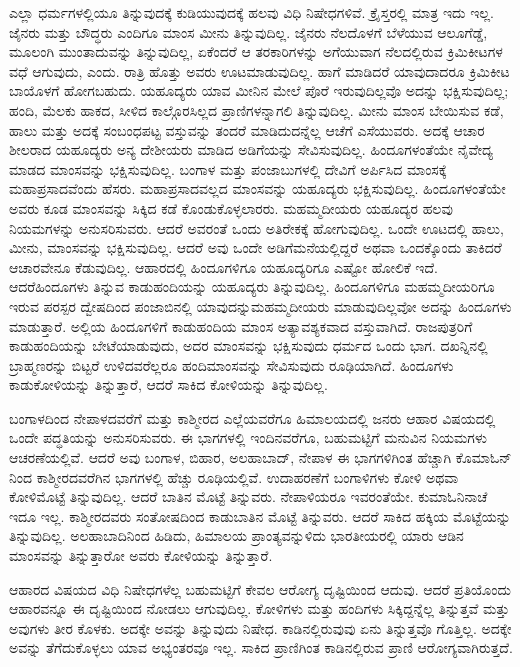 ಎಲ್ಲಾ ಧರ್ಮಗಳಲ್ಲಿಯೂ ತಿನ್ನುವುದಕ್ಕೆ ಕುಡಿಯುವುದಕ್ಕೆ ಹಲವು ವಿಧಿ ನಿಷೇಧಗಳಿವೆ. ಕ್ರೈಸ್ತರಲ್ಲಿ ಮಾತ್ರ ಇದು ಇಲ್ಲ. ಜೈನರು ಮತ್ತು ಬೌದ್ಧರು ಎಂದಿಗೂ ಮಾಂಸ ಮೀನು ತಿನ್ನುವುದಿಲ್ಲ. ಜೈನರು ನೆಲದೊಳಗೆ ಬೆಳೆಯುವ ಆಲೂಗೆಡ್ಡೆ, ಮೂಲಂಗಿ ಮುಂತಾದುವನ್ನು ತಿನ್ನುವುದಿಲ್ಲ, ಏಕೆಂದರೆ ಆ ತರಕಾರಿಗಳನ್ನು ಅಗೆಯುವಾಗ ನೆಲದಲ್ಲಿರುವ ಕ್ರಿಮಿಕೀಟಗಳ ವಧೆ ಆಗುವುದು, ಎಂದು. ರಾತ್ರಿ ಹೊತ್ತು ಅವರು ಊಟಮಾಡುವುದಿಲ್ಲ. ಹಾಗೆ ಮಾಡಿದರೆ ಯಾವುದಾದರೂ ಕ್ರಿಮಿಕೀಟ ಬಾಯೊಳಗೆ ಹೋಗಬಹುದು. ಯಹೂದ್ಯರು ಯಾವ ಮೀನಿನ ಮೇಲೆ ಪೊರೆ ಇರುವುದಿಲ್ಲವೊ ಅದನ್ನು ಭಕ್ಷಿಸುವುದಿಲ್ಲ; ಹಂದಿ, ಮೆಲಕು ಹಾಕದ, ಸೀಳಿದ ಕಾಲ್ಗೊರಸಿಲ್ಲದ ಪ್ರಾಣಿಗಳನ್ನಾಗಲಿ ತಿನ್ನುವುದಿಲ್ಲ. ಮೀನು ಮಾಂಸ ಬೇಯಿಸುವ ಕಡೆ, ಹಾಲು ಮತ್ತು ಅದಕ್ಕೆ ಸಂಬಂಧಪಟ್ಟ ವಸ್ತುವನ್ನು ತಂದರೆ ಮಾಡಿದುದನ್ನೆಲ್ಲ ಆಚೆಗೆ ಎಸೆಯುವರು. ಅದಕ್ಕೆ ಆಚಾರ ಶೀಲರಾದ ಯಹೂದ್ಯರು ಅನ್ಯ ದೇಶೀಯರು ಮಾಡಿದ ಅಡಿಗೆಯನ್ನು ಸೇವಿಸುವುದಿಲ್ಲ. ಹಿಂದೂಗಳಂತೆಯೇ ನೈವೇದ್ಯ ಮಾಡದ ಮಾಂಸವನ್ನು ಭಕ್ಷಿಸುವುದಿಲ್ಲ. ಬಂಗಾಳ ಮತ್ತು ಪಂಜಾಬುಗಳಲ್ಲಿ ದೇವಿಗೆ ಅರ್ಪಿಸಿದ ಮಾಂಸಕ್ಕೆ ಮಹಾಪ್ರಸಾದವೆಂದು ಹೆಸರು. ಮಹಾಪ್ರಸಾದವಲ್ಲದ ಮಾಂಸವನ್ನು ಯಹೂದ್ಯರು ಭಕ್ಷಿಸುವುದಿಲ್ಲ. ಹಿಂದೂಗಳಂತೆಯೇ ಅವರು ಕೂಡ ಮಾಂಸವನ್ನು ಸಿಕ್ಕಿದ ಕಡೆ ಕೊಂಡುಕೊಳ್ಳಲಾರರು. ಮಹಮ್ಮದೀಯರು ಯಹೂದ್ಯರ ಹಲವು ನಿಯಮಗಳನ್ನು ಅನುಸರಿಸುವರು. ಆದರೆ ಅವರಂತೆ ಒಂದು ಅತಿರೇಕಕ್ಕೆ ಹೋಗುವುದಿಲ್ಲ. ಒಂದೇ ಊಟದಲ್ಲಿ ಹಾಲು, ಮೀನು, ಮಾಂಸವನ್ನು ಭಕ್ಷಿಸುವುದಿಲ್ಲ. ಆದರೆ ಅವು ಒಂದೇ ಅಡಿಗೆಮನೆಯಲ್ಲಿದ್ದರೆ ಅಥವಾ ಒಂದಕ್ಕೊಂದು ತಾಕಿದರೆ ಆಚಾರವೇನೂ ಕೆಡುವುದಿಲ್ಲ. ಆಹಾರದಲ್ಲಿ ಹಿಂದೂಗಳಿಗೂ ಯಹೂದ್ಯರಿಗೂ ಎಷ್ಟೋ ಹೋಲಿಕೆ ಇದೆ. ಆದರೆ\break ಹಿಂದೂಗಳು ತಿನ್ನುವ ಕಾಡುಹಂದಿಯನ್ನು ಯಹೂದ್ಯರು ತಿನ್ನುವುದಿಲ್ಲ. ಹಿಂದೂಗಳಿಗೂ ಮಹಮ್ಮದೀಯರಿಗೂ ಇರುವ ಪರಸ್ಪರ ದ್ವೇಷದಿಂದ ಪಂಜಾಬಿನಲ್ಲಿ ಯಾವುದನ್ನು\break ಮಹಮ್ಮದೀಯರು ಮಾಡುವುದಿಲ್ಲವೋ ಅದನ್ನು ಹಿಂದೂಗಳು ಮಾಡುತ್ತಾರೆ. ಅಲ್ಲಿಯ ಹಿಂದೂಗಳಿಗೆ ಕಾಡುಹಂದಿಯ ಮಾಂಸ ಅತ್ಯಾವಶ್ಯಕವಾದ ವಸ್ತುವಾಗಿದೆ. ರಾಜಪುತ್ರರಿಗೆ ಕಾಡುಹಂದಿಯನ್ನು ಬೇಟೆಯಾಡುವುದು, ಅದರ ಮಾಂಸವನ್ನು ಭಕ್ಷಿಸುವುದು ಧರ್ಮದ ಒಂದು ಭಾಗ. ದಖನ್ನಿನಲ್ಲಿ ಬ್ರಾಹ್ಮಣರನ್ನು ಬಿಟ್ಟರೆ ಉಳಿದವರೆಲ್ಲರೂ ಹಂದಿಮಾಂಸವನ್ನು ಸೇವಿಸುವುದು ರೂಢಿಯಾಗಿದೆ. ಹಿಂದೂಗಳು ಕಾಡುಕೋಳಿಯನ್ನು ತಿನ್ನುತ್ತಾರೆ, ಆದರೆ ಸಾಕಿದ ಕೋಳಿಯನ್ನು ತಿನ್ನುವುದಿಲ್ಲ.

ಬಂಗಾಳದಿಂದ ನೇಪಾಳದವರೆಗೆ ಮತ್ತು ಕಾಶ್ಮೀರದ ಎಲ್ಲೆಯವರೆಗೂ ಹಿಮಾಲಯದಲ್ಲಿ ಜನರು ಆಹಾರ ವಿಷಯದಲ್ಲಿ ಒಂದೇ ಪದ್ಧತಿಯನ್ನು ಅನುಸರಿಸುವರು. ಈ ಭಾಗಗಳಲ್ಲಿ ಇಂದಿನವರೆಗೂ, ಬಹುಮಟ್ಟಿಗೆ ಮನುವಿನ ನಿಯಮಗಳು ಆಚರಣೆಯಲ್ಲಿವೆ. ಆದರೆ ಅವು ಬಂಗಾಳ, ಬಿಹಾರ, ಅಲಹಾಬಾದ್​, ನೇಪಾಳ ಈ ಭಾಗಗಳಿಗಿಂತ ಹೆಚ್ಚಾಗಿ ಕೊಮಾಓನ್​ನಿಂದ ಕಾಶ್ಮೀರದವರೆಗಿನ ಭಾಗಗಳಲ್ಲಿ ಹೆಚ್ಚು ರೂಢಿಯಲ್ಲಿವೆ. ಉದಾಹರಣೆಗೆ ಬಂಗಾಳಿಗಳು ಕೋಳಿ ಅಥವಾ ಕೋಳಿಮೊಟ್ಟೆ ತಿನ್ನುವುದಿಲ್ಲ. ಆದರೆ ಬಾತಿನ ಮೊಟ್ಟೆ ತಿನ್ನುವರು. ನೇಪಾಳಿಯರೂ ಇವರಂತೆಯೇ. ಕುಮಾಓನಿನಾಚೆ ಇದೂ ಇಲ್ಲ. ಕಾಶ್ಮೀರ\break ದವರು ಸಂತೋಷದಿಂದ ಕಾಡುಬಾತಿನ ಮೊಟ್ಟೆ ತಿನ್ನುವರು. ಆದರೆ ಸಾಕಿದ ಹಕ್ಕಿಯ ಮೊಟ್ಟೆಯನ್ನು ತಿನ್ನುವುದಿಲ್ಲ. ಅಲಹಾಬಾದಿನಿಂದ ಹಿಡಿದು, ಹಿಮಾಲಯ ಪ್ರಾಂತ್ಯವನ್ನು\break ಳಿದು ಭಾರತೀಯರಲ್ಲಿ ಯಾರು ಆಡಿನ ಮಾಂಸವನ್ನು ತಿನ್ನುತ್ತಾರೋ ಅವರು ಕೋಳಿಯನ್ನು ತಿನ್ನುತ್ತಾರೆ.

ಆಹಾರದ ವಿಷಯದ ವಿಧಿ ನಿಷೇಧಗಳೆಲ್ಲ ಬಹುಮಟ್ಟಿಗೆ ಕೇವಲ ಆರೋಗ್ಯ ದೃಷ್ಟಿಯಿಂದ ಆದುವು. ಆದರೆ ಪ್ರತಿಯೊಂದು ಆಹಾರವನ್ನೂ ಈ ದೃಷ್ಟಿಯಿಂದ ನೋಡಲು ಆಗುವುದಿಲ್ಲ. ಕೋಳಿಗಳು ಮತ್ತು ಹಂದಿಗಳು ಸಿಕ್ಕಿದ್ದನ್ನೆಲ್ಲ ತಿನ್ನುತ್ತವೆ ಮತ್ತು ಅವುಗಳು ತೀರ ಕೊಳಕು. ಅದಕ್ಕೇ ಅವನ್ನು ತಿನ್ನುವುದು ನಿಷೇಧ. ಕಾಡಿನಲ್ಲಿರುವುವು ಏನು ತಿನ್ನುತ್ತವೊ ಗೊತ್ತಿಲ್ಲ. ಅದಕ್ಕೇ ಅವನ್ನು ತೆಗೆದುಕೊಳ್ಳಲು ಯಾವ ಅಭ್ಯಂತರವೂ ಇಲ್ಲ. ಸಾಕಿದ ಪ್ರಾಣಿಗಿಂತ ಕಾಡಿನಲ್ಲಿರುವ ಪ್ರಾಣಿ ಆರೋಗ್ಯವಾಗಿರುತ್ತದೆ.

